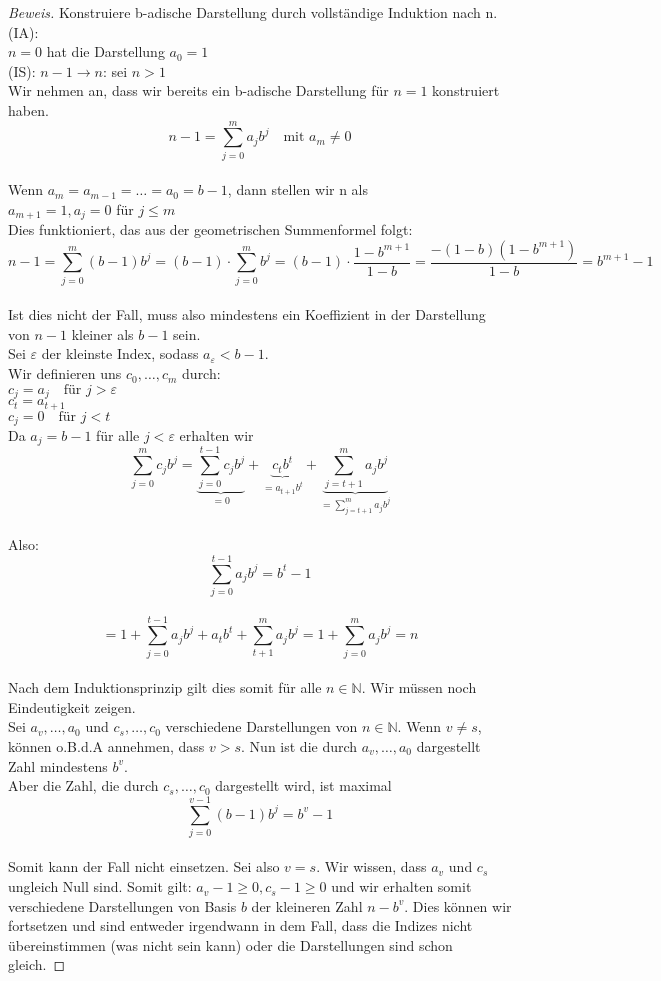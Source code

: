 \documentclass[12pt,a4paper,titlepage]{article} %
\theoremstyle{definition}
\theoremstyle{remark}
\newenvironment{bew}{\begin{proof}[Beweis]}{\end{proof}}
\newcommand{\N}{\mathbb{N}}
\begin{document}
	\begin{bew}
		Konstruiere b-adische Darstellung durch vollständige Induktion nach n.\\
		(IA):\\
		\(n = 0\) hat die Darstellung \(a_0 = 1\)\\
		(IS): \(n - 1 \rightarrow n\): sei \(n > 1\)\\
		Wir nehmen an, dass wir bereits ein b-adische Darstellung für \(n = 1\) konstruiert haben.\\
		\[n-1 = \sum_{j=0}^{m} a_jb^j \quad \text{mit } a_m \neq 0\]\\
		Wenn \(a_m = a_{m-1} = \dots = a_0 = b-1\), dann stellen wir n als\\
		\(a_{m+1} = 1, a_j = 0\) für \(j \leq m\)\\
		Dies funktioniert, das aus der geometrischen Summenformel folgt:\\
		\[n-1 = \sum_{j=0}^{m} (b-1)b^j = (b-1) \cdot \sum_{j=0}^{m}b^j = (b-1) \cdot \frac{1- b^{m+1}}{1-b} = \frac{-(1-b)(1-b^{m+1})}{1-b} = b^{m+1}-1\]\\
		Ist dies nicht der Fall, muss also mindestens ein Koeffizient in der Darstellung von \(n-1\) kleiner als \(b-1\) sein.\\
		Sei \(\varepsilon\) der kleinste Index, sodass \(a_{\varepsilon} < b-1\).\\
		Wir definieren uns \(c_0, \dots, c_m\) durch:\\
		\(c_j = a_j \quad \text{für } j > \varepsilon\)\\
		\(c_t = a_{t+1}\)\\
		\(c_j = 0 \quad \text{für } j < t\)\\
		Da \(a_j = b-1\) für alle \(j<\varepsilon\) erhalten wir\\
		\[\sum_{j=0}^{m} c_jb^j = \underbrace{\sum_{j=0}^{t-1} c_jb^j}_{=0} + \underbrace{c_tb^t}_{=a_{t+1}b^t} + \underbrace{\sum_{j=t+1}^{m} a_jb^j}_{=\sum_{j=t+1}^{m} a_jb^j}\]\\
		Also:
		\[\sum_{j=0}^{t-1} a_jb^j = b^t-1\]\\
		\[= 1+\sum_{j=0}^{t-1} a_jb^j + a_tb^t + \sum_{t+1}^{m}a_jb^j = 1+\sum_{j=0}^{m} a_jb^j = n\]\\
		Nach dem Induktionsprinzip gilt dies somit für alle \(n \in \N\). Wir müssen noch Eindeutigkeit zeigen.\\
		Sei \(a_v,\dots, a_0\) und \(c_s,\dots, c_0\) verschiedene Darstellungen von \(n \in \N\). Wenn \(v \neq s\), können o.B.d.A annehmen, dass \(v > s\). Nun ist die durch \(a_v,\dots, a_0\) dargestellt Zahl mindestens \(b^v\).\\
		Aber die Zahl, die durch \(c_s,\dots, c_0\) dargestellt wird, ist maximal\\
		\[\sum_{j=0}^{v-1}(b-1)b^j = b^v - 1\]\\
		Somit kann der Fall nicht einsetzen. Sei also \(v=s\). Wir wissen, dass \(a_v\) und \(c_s\) ungleich Null sind. Somit gilt: \(a_v - 1 \geq 0, c_s - 1 \geq 0\) und wir erhalten somit verschiedene Darstellungen von Basis \(b\) der kleineren Zahl \(n-b^v\). Dies können wir fortsetzen und sind entweder irgendwann in dem Fall, dass die Indizes nicht übereinstimmen (was nicht sein kann) oder die Darstellungen sind schon gleich.
	\end{bew}
\end{document}
